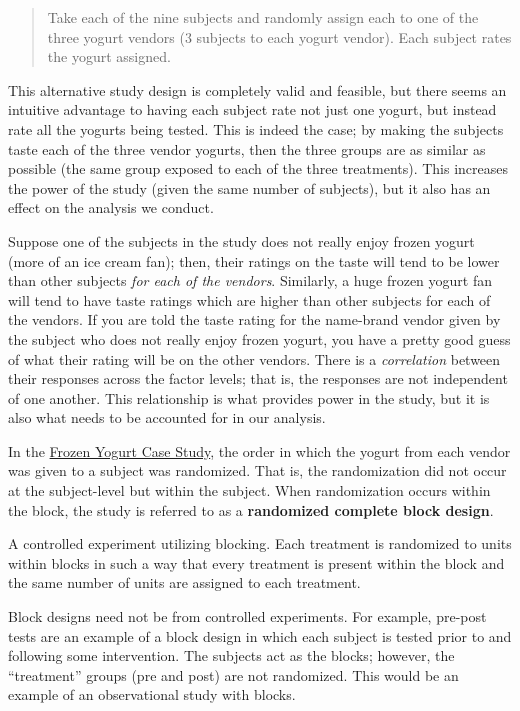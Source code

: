 \documentclass[]{book}
\theoremstyle{plain}
\theoremstyle{mydefn}
\theoremstyle{myexmpl}
\theoremstyle{remark}
\let\BeginKnitrBlock\begin \let\EndKnitrBlock\end
\let\BeginKnitrBlock\begin \let\EndKnitrBlock\end
\begin{document}
\begin{quote}
Take each of the nine subjects and randomly assign each to one of the
three yogurt vendors (3 subjects to each yogurt vendor). Each subject
rates the yogurt assigned.
\end{quote}

This alternative study design is completely valid and feasible, but
there seems an intuitive advantage to having each subject rate not just
one yogurt, but instead rate all the yogurts being tested. This is
indeed the case; by making the subjects taste each of the three vendor
yogurts, then the three groups are as similar as possible (the same
group exposed to each of the three treatments). This increases the power
of the study (given the same number of subjects), but it also has an
effect on the analysis we conduct.

Suppose one of the subjects in the study does not really enjoy frozen
yogurt (more of an ice cream fan); then, their ratings on the taste will
tend to be lower than other subjects \emph{for each of the vendors}.
Similarly, a huge frozen yogurt fan will tend to have taste ratings
which are higher than other subjects for each of the vendors. If you are
told the taste rating for the name-brand vendor given by the subject who
does not really enjoy frozen yogurt, you have a pretty good guess of
what their rating will be on the other vendors. There is a
\emph{correlation} between their responses across the factor levels;
that is, the responses are not independent of one another. This
relationship is what provides power in the study, but it is also what
needs to be accounted for in our analysis.

In the \protect\hyperlink{CaseYogurt}{Frozen Yogurt Case Study}, the
order in which the yogurt from each vendor was given to a subject was
randomized. That is, the randomization did not occur at the
subject-level but within the subject. When randomization occurs within
the block, the study is referred to as a \textbf{randomized complete
block design}.

\BeginKnitrBlock{definition}[Randomized Complete Block Design]
\protect\hypertarget{def:defn-rcbd}{}{\label{def:defn-rcbd}
{} }A controlled
experiment utilizing blocking. Each treatment is randomized to units
within blocks in such a way that every treatment is present within the
block and the same number of units are assigned to each treatment.
\EndKnitrBlock{definition}

Block designs need not be from controlled experiments. For example,
pre-post tests are an example of a block design in which each subject is
tested prior to and following some intervention. The subjects act as the
blocks; however, the ``treatment'' groups (pre and post) are not
randomized. This would be an example of an observational study with
blocks.
\end{document}
